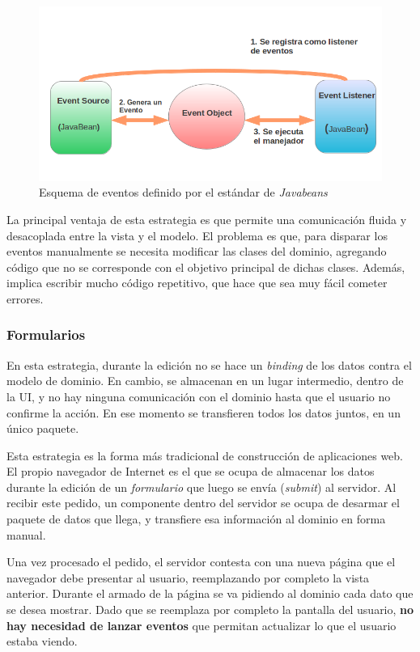 	 \begin{figure}[h]
	 	\centering
		\includegraphics[scale=0.4]{img/javabeans}
		\caption{Esquema de eventos definido por el estándar de \emph{Javabeans}}
		\label{javabeans}
	\end{figure}

	La principal ventaja de esta estrategia es que permite una comunicación fluida
	y desacoplada entre la vista y el modelo.
	El problema es que, para disparar los eventos manualmente se necesita modificar
	las clases del dominio, agregando código que no se corresponde con el objetivo
	principal de dichas clases.
	Además, implica escribir mucho código repetitivo, que hace que sea muy fácil cometer errores.

\subsubsection{Formularios}

	En esta estrategia, durante la edición no se hace un \emph{binding} de los
	datos contra el modelo de dominio. En cambio, se almacenan en un lugar
	intermedio, dentro de la UI, y no hay ninguna comunicación
	con el dominio hasta que el usuario no confirme la acción. En ese momento se
	transfieren todos los datos juntos, en un único paquete.
	
	Esta estrategia es la forma más tradicional de construcción de aplicaciones
	web. El propio navegador de Internet es el que se ocupa de almacenar los
	datos durante la edición de un \emph{formulario} que luego se envía
	(\emph{submit}) al servidor. 
	Al recibir este pedido, un componente dentro del servidor se ocupa de desarmar
	el paquete de datos que llega, y transfiere esa información al dominio en forma
	manual.
	
	Una vez procesado el pedido, el servidor contesta con una nueva página que
	el navegador debe presentar al usuario, reemplazando por completo la vista
	anterior.
	Durante el armado de la página se va pidiendo al dominio cada dato que se desea
	mostrar. Dado que se reemplaza por completo la pantalla del usuario, \textbf{no
	hay necesidad de lanzar eventos} que permitan actualizar lo que el usuario
	estaba viendo.
	
